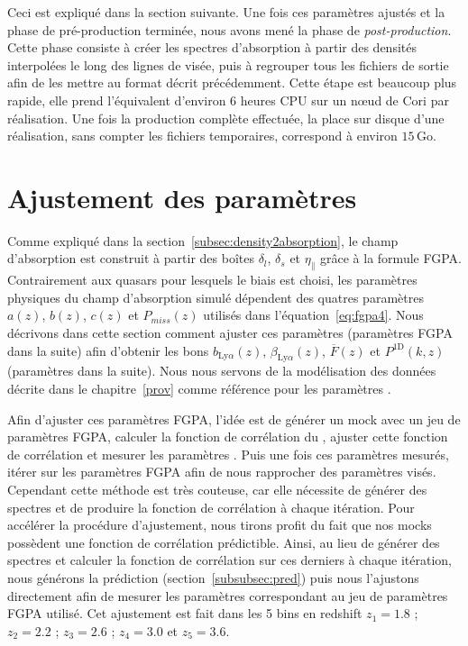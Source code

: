 \documentclass[11pt, twoside, a4paper, openright]{report}
\begin{document}
Ceci est expliqué dans la section suivante. Une fois ces paramètres ajustés et la phase de pré-production terminée, nous avons mené la phase de \emph{post-production}. Cette phase consiste à créer les spectres d'absorption à partir des densités interpolées le long des lignes de visée, puis à regrouper tous les fichiers de sortie afin de les mettre au format décrit précédemment. Cette étape est beaucoup plus rapide, elle prend l'équivalent d'environ 6 heures CPU sur un n{\oe}ud de Cori par réalisation. Une fois la production complète effectuée, la place sur disque d'une réalisation, sans compter les fichiers temporaires, correspond à environ $\num{15}\,\mathrm{Go}$.


\section{Ajustement des paramètres}
\label{sec:tuning}
Comme expliqué dans la section~\ref{subsec:density2absorption}, le champ d'absorption \lya{} est construit à partir des boîtes $\delta_l$, $\delta_s$ et $\eta_{\parallel}$ grâce à la formule FGPA.
Contrairement aux quasars pour lesquels le biais est choisi, les paramètres physiques du champ d'absorption \lya{} simulé dépendent des quatres paramètres $a(z)$, $b(z)$, $c(z)$ et $P_{miss}(z)$ utilisés dans l'équation~\ref{eq:fgpa4}.
Nous décrivons dans cette section comment ajuster ces paramètres (paramètres FGPA dans la suite) afin d'obtenir les bons $b_{\mathrm{Ly}\alpha}(z)$, $\beta_{\mathrm{Ly}\alpha}(z)$, $\overline F(z)$ et $P^{\mathrm{1D}}(k, z)$ (paramètres \lya{} dans la suite). Nous nous servons de la modélisation des données décrite dans le chapitre~\ref{prov} comme référence pour les paramètres \lya{}.


Afin d'ajuster ces paramètres FGPA, l'idée est de générer un mock avec un jeu de paramètres FGPA, calculer la fonction de corrélation du \lya{}, ajuster cette fonction de corrélation et mesurer les paramètres \lya{}. Puis une fois ces paramètres mesurés, itérer sur les paramètres FGPA afin de nous rapprocher des paramètres \lya{} visés. Cependant cette méthode est très couteuse, car elle nécessite de générer des spectres et de produire la fonction de corrélation à chaque itération.
Pour accélérer la procédure d'ajustement, nous tirons profit du fait que nos mocks possèdent une fonction de corrélation prédictible.
Ainsi, au lieu de générer des spectres et calculer la fonction de corrélation sur ces derniers à chaque itération, nous générons la prédiction (section~\ref{subsubsec:pred}) puis nous l'ajustons directement afin de mesurer les paramètres \lya{} correspondant au jeu de paramètres FGPA utilisé.
Cet ajustement est fait dans les 5 bins en redshift $z_1 = \num{1.8}$ ; $z_2 = \num{2.2}$ ; $z_3 = \num{2.6}$ ; $z_4 = \num{3.0}$ et $z_5 = \num{3.6}$.
\end{document}
